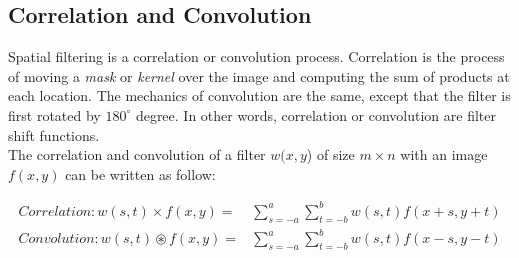 \documentclass{standalone}
\begin{document}
\subsection{Correlation and Convolution}


Spatial filtering is a correlation or convolution process.
Correlation is the process of moving a \textit{mask} or \textit{kernel} over the image and computing the sum of products at each location\cite{corrandconv}.
The mechanics of convolution are the same, except that the filter is first rotated by $180^{\circ}$ degree.
In other words, correlation or convolution are filter shift functions.\\
The correlation and convolution of a filter $w(x, y$) of size $m \times n$ with an image $f(x, y)$ can be written as follow:

\begin{align}
    Correlation:  w(s, t) \times f(x, y) = & \sum_{s = -a}^{a} \sum_{t = -b}^{b} w(s, t) f(x + s, y + t) \\
    Convolution:  w(s, t) \circledast f(x, y) = & \sum_{s = -a}^{a} \sum_{t = -b}^{b} w(s, t) f(x - s, y - t) 
\end{align}
\end{document}
